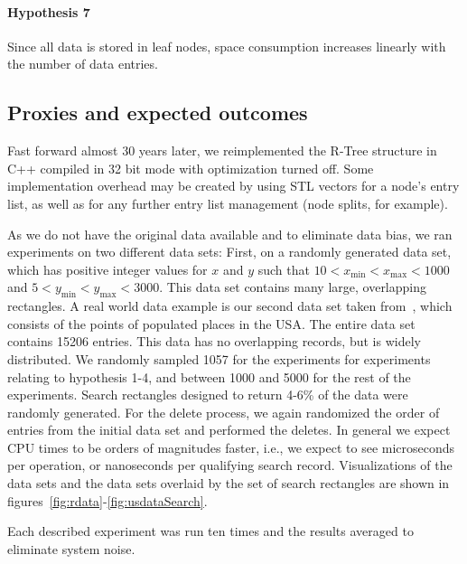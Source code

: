 \paragraph{Hypothesis 7}
Since all data is stored in leaf nodes, space consumption increases linearly with the number of data entries. 

\subsection{Proxies and expected outcomes}
Fast forward almost 30 years later, we reimplemented the R-Tree structure in C++ compiled in 32 bit mode with optimization turned off. Some implementation overhead may be created by using STL vectors for a node's entry list, as well as for any further entry list management (node splits, for example).

As we do not have the original data available and to eliminate data bias, we ran experiments on two different data sets: First, on a randomly generated data set, which has positive integer values for $x$ and $y$ such that $10 < x_{\mathrm{min}} < x_{\mathrm{max}} < 1000$ and  $5 < y_{\mathrm{min}} < y_{\mathrm{max}} < 3000$. This data set contains many large, overlapping rectangles. A real world data example is our second data set taken from~\cite{Online:usppdata}, which consists of the points of populated places in the USA. The entire data set contains 15206 entries. This data has no overlapping records, but is widely distributed. We randomly sampled 1057 for the experiments for experiments relating to hypothesis 1-4, and between 1000 and 5000 for the rest of the experiments.
Search rectangles designed to return 4-6\% of the data were randomly generated. For the delete process, we again randomized the order of entries from the initial data set and performed the deletes. In general we expect CPU times to be orders of magnitudes faster, i.e., we expect to see microseconds per operation, or nanoseconds per qualifying search record. Visualizations of the data sets and the data sets overlaid by the set of search rectangles are shown in figures~\ref{fig:rdata}-\ref{fig:usdataSearch}.

Each described experiment was run ten times and the results averaged to eliminate system noise.


